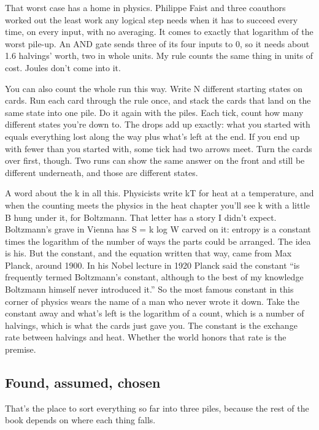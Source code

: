 \documentclass[11pt,twoside]{article}
\theoremstyle{thielethm}
\theoremstyle{thieledef}
\theoremstyle{thieledef}
\theoremstyle{thieledef}
\theoremstyle{thielethm}
\theoremstyle{thieleobs}
\theoremstyle{thielethm}
\begin{document}
That worst case has a home in physics. Philippe Faist and three coauthors worked out the least work any logical step needs when it has to succeed every time, on every input, with no averaging. It comes to exactly that logarithm of the worst pile-up. An AND gate sends three of its four inputs to 0, so it needs about 1.6 halvings' worth, two in whole units. My rule counts the same thing in units of cost. Joules don't come into it.

You can also count the whole run this way. Write N different starting states on cards. Run each card through the rule once, and stack the cards that land on the same state into one pile. Do it again with the piles. Each tick, count how many different states you're down to. The drops add up exactly: what you started with equals everything lost along the way plus what's left at the end. If you end up with fewer than you started with, some tick had two arrows meet. Turn the cards over first, though. Two runs can show the same answer on the front and still be different underneath, and those are different states.

A word about the k in all this. Physicists write kT for heat at a temperature, and when the counting meets the physics in the heat chapter you'll see k with a little B hung under it, for Boltzmann. That letter has a story I didn't expect. Boltzmann's grave in Vienna has S = k log W carved on it: entropy is a constant times the logarithm of the number of ways the parts could be arranged. The idea is his. But the constant, and the equation written that way, came from Max Planck, around 1900. In his Nobel lecture in 1920 Planck said the constant ``is frequently termed Boltzmann's constant, although to the best of my knowledge Boltzmann himself never introduced it.'' So the most famous constant in this corner of physics wears the name of a man who never wrote it down. Take the constant away and what's left is the logarithm of a count, which is a number of halvings, which is what the cards just gave you. The constant is the exchange rate between halvings and heat. Whether the world honors that rate is the premise.

\subsection{Found, assumed, chosen}

That's the place to sort everything so far into three piles, because the rest of the book depends on where each thing falls.
\end{document}
